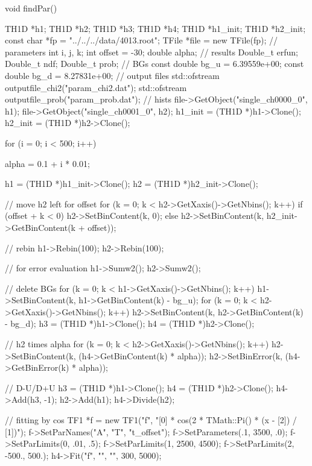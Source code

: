 \documentclass[dvipdfmx]{jsarticle}
\begin{document}
\begin{mylisting}[language=c++,caption=findPar.C]
void findPar()
{
    TH1D *h1;
    TH1D *h2;
    TH1D *h3;
    TH1D *h4;
    TH1D *h1_init;
    TH1D *h2_init;
    const char *fp = "../../../data/4013.root";
    TFile *file = new TFile(fp);
    // parameters
    int i, j, k;
    int offset = -30;
    double alpha;
    // results
    Double_t erfun;
    Double_t ndf;
    Double_t prob;
    // BGs
    const double bg_u = 6.39559e+00;
    const double bg_d = 8.27831e+00;
    // output files
    std::ofstream outputfile_chi2("param_chi2.dat");
    std::ofstream outputfile_prob("param_prob.dat");
    // hists
    file->GetObject("single_ch0000_0", h1);
    file->GetObject("single_ch0001_0", h2);
    h1_init = (TH1D *)h1->Clone();
    h2_init = (TH1D *)h2->Clone();

    for (i = 0; i < 500; i++)
    {
        alpha = 0.1 + i * 0.01;

        h1 = (TH1D *)h1_init->Clone();
        h2 = (TH1D *)h2_init->Clone();

        // move h2 left for offset
        for (k = 0; k < h2->GetXaxis()->GetNbins(); k++)
        {
            if (offset + k < 0)
            {
                h2->SetBinContent(k, 0);
            }
            else
            {
                h2->SetBinContent(k, h2_init->GetBinContent(k + offset));
            }
        }

        // rebin
        h1->Rebin(100);
        h2->Rebin(100);

        // for error evaluation
        h1->Sumw2();
        h2->Sumw2();

        // delete BGs
        for (k = 0; k < h1->GetXaxis()->GetNbins(); k++)
        {
            h1->SetBinContent(k, h1->GetBinContent(k) - bg_u);
        }
        for (k = 0; k < h2->GetXaxis()->GetNbins(); k++)
        {
            h2->SetBinContent(k, h2->GetBinContent(k) - bg_d);
        }
        h3 = (TH1D *)h1->Clone();
        h4 = (TH1D *)h2->Clone();

        // h2 times alpha
        for (k = 0; k < h2->GetXaxis()->GetNbins(); k++)
        {
            h2->SetBinContent(k,  (h4->GetBinContent(k) * alpha));
            h2->SetBinError(k, (h4->GetBinError(k) * alpha));
        }

        // D-U/D+U
        h3 = (TH1D *)h1->Clone();
        h4 = (TH1D *)h2->Clone();
        h4->Add(h3, -1);
        h2->Add(h1);
        h4->Divide(h2);

        // fitting by cos
        TF1 *f = new TF1("f", "[0] * cos(2 * TMath::Pi() * (x - [2]) / [1])");
        f->SetParNames("A", "T", "t_offset");
        f->SetParameters(.1, 3500, .0);
        f->SetParLimits(0, .01, .5);
        f->SetParLimits(1, 2500, 4500);
        f->SetParLimits(2, -500., 500.);
        h4->Fit("f", "", "", 300, 5000);

}}
\end{mylisting}
\end{document}
